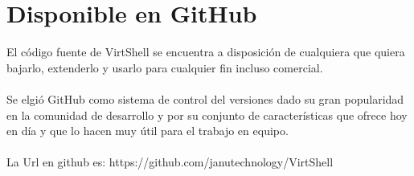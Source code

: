 \appendix
\chapter{Disponible en GitHub}
\label{GitHub}
El código fuente de VirtShell se encuentra a disposición de cualquiera que quiera bajarlo, extenderlo y usarlo para cualquier fin incluso comercial.\\
\\
Se elgió GitHub como sistema de control del versiones dado su gran popularidad en la comunidad de desarrollo y por su conjunto de características que ofrece hoy en día y que lo hacen muy útil para el trabajo en equipo.\\
\\
La Url en github es: https://github.com/janutechnology/VirtShell